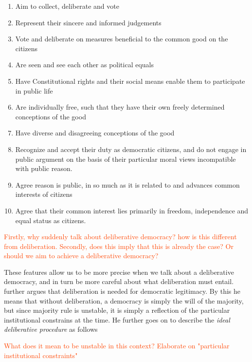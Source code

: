 \begin{enumerate}
	\label{list:deliberative-democracy}
	\setlength\itemsep{1px}
	\item  Aim to collect, deliberate and vote
	\item  Represent their sincere and informed judgements
	\item  Vote and deliberate on measures beneficial to the common good on the citizens
	\item  Are seen and see each other as political equals
	\item  Have Constitutional rights and their social means enable them to participate in public life
	\item  Are individually free, such that they have their own freely determined conceptions of the good
	\item  Have diverse and disagreeing conceptions of the good
	\item  Recognize and accept their duty as democratic citizens, and do not engage in public argument on the basis of their particular moral views incompatible with public reason.
	\item  Agree reason is public, in so much as it is related to and advances common interests of citizens
	\item  Agree that their common interest lies primarily in freedom, independence and equal status as citizens.
\end{enumerate}

\textcolor{OrangeRed}{Firstly, why suddenly talk about deliberative democracy? how is this different from deliberation. Secondly, does this imply that this is already the case? Or should we aim to achieve a deliberative democracy?}

These features allow us to be more precise when we talk about a deliberative democracy, and in turn be more careful about what deliberation must entail. \citet{cohenDeliberationDemocraticLegimitimacy2002} further argues that deliberation is needed for democratic legitimacy. By this he means that without deliberation, a democracy is simply the will of the majority, but since majority rule is unstable, it is simply a reflection of the particular institutional constrains at the time. He further goes on to describe the \emph{ideal deliberative procedure} as follows

\textcolor{OrangeRed}{What does it mean to be unstable in this context? Elaborate on "particular institutional constraints"}

